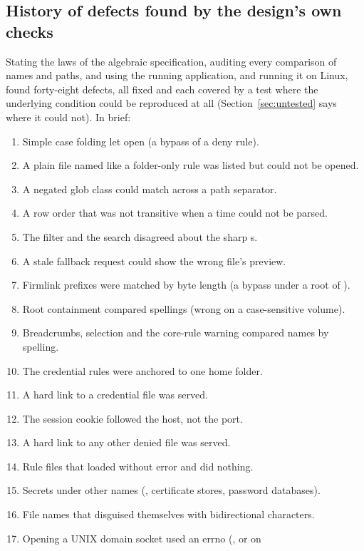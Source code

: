 \subsection{History of defects found by the design's own checks}

Stating the laws of the algebraic specification, auditing every comparison of names and paths,
and using the running application, and running it on Linux, found forty-eight defects, all fixed and each covered by a test where
the underlying condition could be reproduced at all (Section~\ref{sec:untested} says where it could not).
In brief:

\begin{enumerate}
  \item Simple case folding let  open  (a bypass of a deny rule).
  \item A plain file named like a folder-only rule was listed but could not be opened.
  \item A negated glob class could match across a path separator.
  \item A row order that was not transitive when a time could not be parsed.
  \item The filter and the search disagreed about the sharp s.
  \item A stale fallback request could show the wrong file's preview.
  \item Firmlink prefixes were matched by byte length (a bypass under a root of \code{/}).
  \item Root containment compared spellings (wrong on a case-sensitive volume).
  \item Breadcrumbs, selection and the core-rule warning compared names by spelling.
  \item The credential rules were anchored to one home folder.
  \item A hard link to a credential file was served.
  \item The session cookie followed the host, not the port.
  \item A hard link to any other denied file was served.
  \item Rule files that loaded without error and did nothing.
  \item Secrets under other names (, certificate stores, password databases).
  \item File names that disguised themselves with bidirectional characters.
  \item Opening a UNIX domain socket used an errno (, or  on

\end{enumerate}
